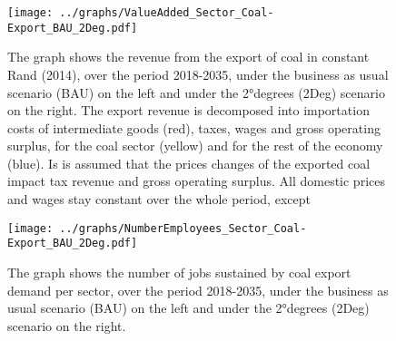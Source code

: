 \documentclass[12pt,english]{article}
\begin{document}
\begin{figure}[!h]
	\hspace{-10pt}\texttt{[image: ../graphs/ValueAdded\_Sector\_Coal-Export\_BAU\_2Deg.pdf]}
	\caption{\label{ValueAdded_Sector_Coal-Export_BAU_2Deg}\small The graph shows the revenue from the export of coal in constant Rand (2014), over the period 2018-2035, under the business as usual scenario (BAU) on the left and under the 2°degrees (2Deg) scenario on the right. The export revenue is decomposed into importation costs of intermediate goods (red), taxes, wages and gross operating surplus, for the coal sector (yellow) and for the rest of the economy (blue). Is is assumed that the prices changes of the exported coal impact tax revenue and gross operating surplus. All domestic prices and wages stay constant over the whole period, except  }
\end{figure}


\begin{figure}[!h]
	\hspace{-10pt}\texttt{[image: ../graphs/NumberEmployees\_Sector\_Coal-Export\_BAU\_2Deg.pdf]}
	\caption{\label{NumberEmployees_Sector_Coal-Export_BAU_2Deg}\small The graph shows the number of jobs sustained by coal export demand per sector, over the period 2018-2035, under the business as usual scenario (BAU) on the left and under the 2°degrees (2Deg) scenario on the right.}
\end{figure}
\end{document}
